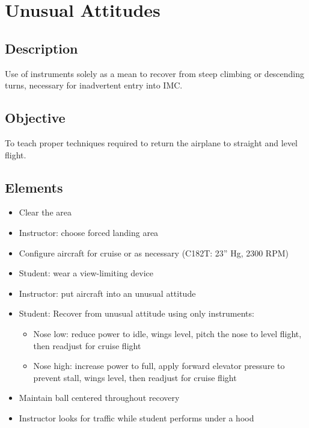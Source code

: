 \section{Unusual Attitudes}

\subsection{Description}

Use of instruments solely as a mean to recover from steep climbing or
descending turns, necessary for inadvertent entry into IMC.

\subsection{Objective}

To teach proper techniques required to return the airplane to straight and
level flight.

\subsection{Elements}

\begin{itemize}
  \item Clear the area
  \item Instructor: choose forced landing area
  \item Configure aircraft for cruise or as necessary (C182T: 23'' Hg, 2300
    RPM)
  \item Student: wear a view-limiting device
  \item Instructor: put aircraft into an unusual attitude
  \item Student: Recover from unusual attitude using only instruments:
    \begin{itemize}
      \item Nose low: reduce power to idle, wings level, pitch the nose to
        level flight, then readjust for cruise flight
      \item Nose high: increase power to full, apply forward elevator pressure
        to prevent stall, wings level, then readjust for cruise flight
    \end{itemize}
  \item Maintain ball centered throughout recovery
  \item Instructor looks for traffic while student performs under a hood
\end{itemize}

